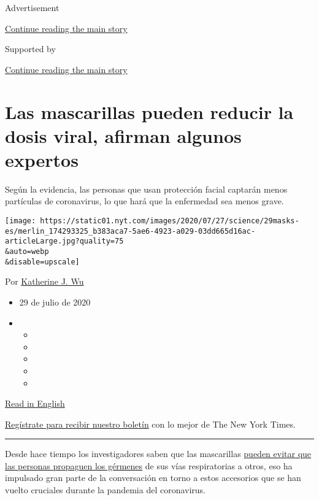 Advertisement

\protect\hyperlink{after-top}{Continue reading the main story}

Supported by

\protect\hyperlink{after-sponsor}{Continue reading the main story}

\hypertarget{las-mascarillas-pueden-reducir-la-dosis-viral-afirman-algunos-expertos}{%
\section{Las mascarillas pueden reducir la dosis viral, afirman algunos
expertos}\label{las-mascarillas-pueden-reducir-la-dosis-viral-afirman-algunos-expertos}}

Según la evidencia, las personas que usan protección facial captarán
menos partículas de coronavirus, lo que hará que la enfermedad sea menos
grave.

\texttt{[image: https://static01.nyt.com/images/2020/07/27/science/29masks-es/merlin\_174293325\_b383aca7-5ae6-4923-a029-03dd665d16ac-articleLarge.jpg?quality=75\\\&auto=webp\\\&disable=upscale]}

Por \href{https://www.nytimes.com/by/katherine-j--wu}{Katherine J. Wu}

\begin{itemize}
\item
  29 de julio de 2020
\item
  \begin{itemize}
  \item
  \item
  \item
  \item
  \item
  \end{itemize}
\end{itemize}

\href{https://www.nytimes.com/2020/07/27/health/coronavirus-mask-protection.html}{Read
in English}

\href{https://www.nytimes.com/newsletters/el-times}{Regístrate para
recibir nuestro boletín} con lo mejor de The New York Times.

\begin{center}\rule{0.5\linewidth}{\linethickness}\end{center}

Desde hace tiempo los investigadores saben que las mascarillas
\href{https://journals.plos.org/plospathogens/article?id=10.1371/journal.ppat.1003205}{pueden
evitar que las personas propaguen los gérmenes} de sus vías
respiratorias a otros, eso ha impulsado gran parte de la conversación en
torno a estos accesorios que se han vuelto cruciales durante la pandemia
del coronavirus.

